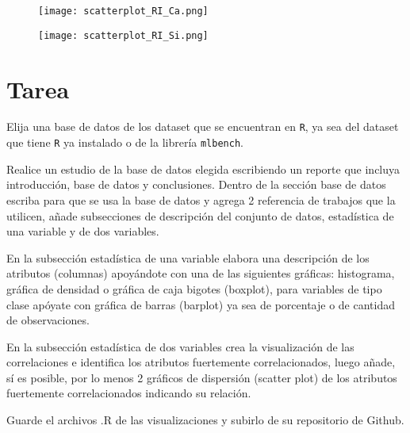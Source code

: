 \begin{figure}
	\centering
	\texttt{[image: scatterplot\_RI\_Ca.png]}
	\caption{} \label{fig:scatter_RICa}
\end{figure}

\begin{figure}
	\centering
	\texttt{[image: scatterplot\_RI\_Si.png]}
	\caption{} \label{fig:scatter_RISi}
\end{figure}

\section{Tarea} \label{sec:tarea}

Elija una base de datos de los dataset que se encuentran en \texttt{R}, ya sea del dataset que tiene \texttt{R} ya instalado o de la librería \texttt{mlbench}.

Realice un estudio de la base de datos elegida escribiendo un reporte que incluya introducción, base de datos y conclusiones. Dentro de la sección base de datos escriba para que se usa la base de datos y agrega 2 referencia de trabajos que la utilicen, añade subsecciones de descripción del conjunto de datos, estadística de una variable y de dos variables.

En la subsección estadística de una variable elabora una descripción de los atributos (columnas) apoyándote con una de las siguientes gráficas: histograma, gráfica de densidad o gráfica de caja bigotes (boxplot), para variables de tipo clase apóyate con gráfica de barras (barplot) ya sea de porcentaje o de cantidad de observaciones.

En la subsección estadística de dos variables crea la visualización de las correlaciones e identifica los atributos fuertemente correlacionados, luego añade, sí es posible, por lo menos 2 gráficos de dispersión (scatter plot) de los atributos fuertemente correlacionados indicando su relación.

Guarde el archivos .R de las visualizaciones y subirlo de su repositorio de Github.\citep{repositorio}





